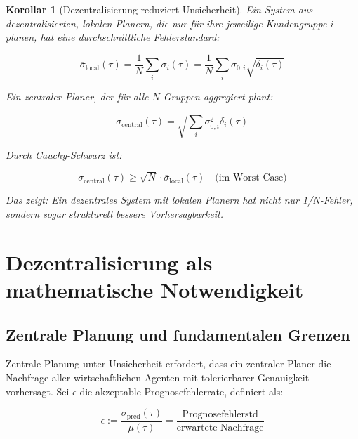 \documentclass[12pt, a4paper, titlepage]{report}
\newtheorem{corollary}[theorem]{Korollar}
\theoremstyle{definition}
\theoremstyle{remark}
\begin{document}
\begin{corollary}[Dezentralisierung reduziert Unsicherheit]
Ein System aus dezentralisierten, lokalen Planern, die nur für ihre jeweilige Kundengruppe $i$ planen, hat eine durchschnittliche Fehlerstandard:

\begin{equation}
\overline{\sigma}_{\text{local}}(\tau) = \frac{1}{N} \sum_i \sigma_i(\tau) = \frac{1}{N} \sum_i \sigma_{0,i} \sqrt{\delta_i(\tau)}
\end{equation}

Ein zentraler Planer, der für alle $N$ Gruppen aggregiert plant:

\begin{equation}
\sigma_{\text{central}}(\tau) = \sqrt{\sum_i \sigma_{0,i}^2 \delta_i(\tau)}
\end{equation}

Durch Cauchy-Schwarz ist:

\begin{equation}
\sigma_{\text{central}}(\tau) \geq \sqrt{N} \cdot \overline{\sigma}_{\text{local}}(\tau) \quad \text{(im Worst-Case)}
\end{equation}

Das zeigt: Ein dezentrales System mit lokalen Planern hat nicht nur 1/N-Fehler, sondern sogar strukturell bessere Vorhersagbarkeit.
\end{corollary}

\chapter{Dezentralisierung als mathematische Notwendigkeit}
\label{sec:dezentralisierung}

\section{Zentrale Planung und fundamentalen Grenzen}

Zentrale Planung unter Unsicherheit erfordert, dass ein zentraler Planer die Nachfrage aller wirtschaftlichen Agenten mit tolerierbarer Genauigkeit vorhersagt. Sei $\epsilon$ die akzeptable Prognosefehlerrate, definiert als:

\begin{equation}
\epsilon := \frac{\sigma_{\text{pred}}(\tau)}{\mu(\tau)} = \frac{\text{Prognosefehlerstd}}{\text{erwartete Nachfrage}}
\label{eq:error_rate}
\end{equation}
\end{document}
